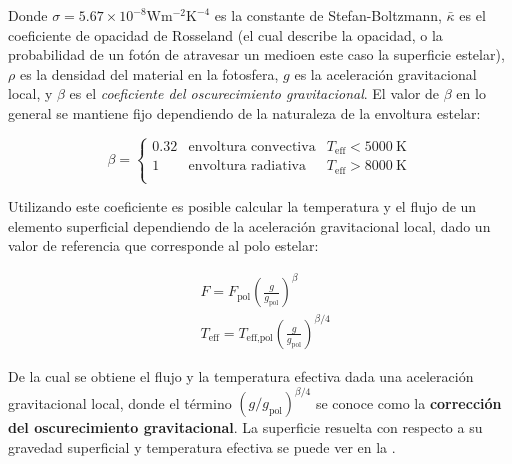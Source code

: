 Donde $\sigma = 5.67 \times 10^{-8} \mathrm{W} \mathrm{m}^{-2} \mathrm{K}^{-4}$
es la constante de Stefan-Boltzmann, $\bar{\kappa}$ es el coeficiente de
opacidad de Rosseland (el cual describe la opacidad, o la probabilidad de un
fotón de atravesar un medio\textemdash en este caso la superficie estelar),
$\rho$ es la densidad del material en la fotosfera, $g$ es la aceleración
gravitacional local, y $\beta$ es el \textit{coeficiente del oscurecimiento
gravitacional}. El valor de $\beta$ en lo general se mantiene fijo dependiendo
de la naturaleza de la envoltura estelar:

\begin{eqfloat}[!ht]
	\centering
	\begin{equation}
		\beta = \left\{\begin{matrix}
			0.32 & \textrm{envoltura convectiva} & T_{\textrm{eff}} < 5000 \ \textrm{K} \\
			1 & \textrm{envoltura radiativa} & T_{\textrm{eff}} > 8000 \ \textrm{K} \\
			\end{matrix}\right. 
	\end{equation}
\end{eqfloat}

Utilizando este coeficiente es posible calcular la temperatura y el flujo de un
elemento superficial dependiendo de la aceleración gravitacional local, dado un
valor de referencia que corresponde al polo estelar:

\begin{eqfloat}[!ht]
	\centering
	\begin{equation}
		\begin{split}
			& F = F_{\textrm{pol}} \left(\frac{g}{g_{\textrm{pol}}}\right)^{\beta} \\
			& T_{\textrm{eff}} = T_{\textrm{eff},\textrm{pol}} \left(\frac{g}{g_{\textrm{pol}}}\right)^{\beta/4}
		\end{split}
	\end{equation}	
\end{eqfloat}

De la cual se obtiene el flujo y la temperatura efectiva dada una aceleración
gravitacional local, donde el término
$\left(g/g_{\mathrm{pol}}\right)^{\beta/4}$ se conoce como la \textbf{corrección
del oscurecimiento gravitacional}. La superficie resuelta con respecto a su
gravedad superficial y temperatura efectiva se puede ver en la
.

